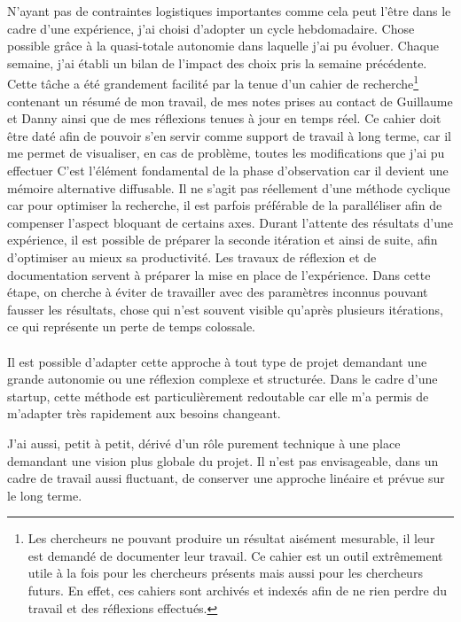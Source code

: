 \documentclass[11pt, a4paper ]{article}
\begin{document}
\begin{spacing}{1.5}
N'ayant pas de contraintes logistiques importantes comme cela peut l'être dans le cadre d'une expérience, j'ai choisi d'adopter un cycle hebdomadaire. Chose possible grâce à la quasi-totale autonomie dans laquelle j'ai pu évoluer. Chaque semaine, j'ai établi un bilan de l'impact des choix pris la semaine précédente. Cette tâche a été grandement facilité par la tenue d'un cahier de recherche\footnote{Les chercheurs ne pouvant produire un résultat aisément mesurable, il leur est demandé de documenter leur travail. Ce cahier est un outil extrêmement utile à la fois pour les chercheurs présents mais aussi pour les chercheurs futurs. En effet, ces cahiers sont archivés et indexés afin de ne rien perdre du travail et des réflexions effectués.} contenant un résumé de mon travail, de mes notes prises au contact de Guillaume et Danny ainsi que de mes réflexions tenues à jour en temps réel. Ce cahier doit être daté afin de pouvoir s'en servir comme support de travail à long terme, car il me permet de visualiser, en cas de problème, toutes les modifications que j'ai pu effectuer C'est l'élément fondamental de la phase d'observation car il devient une mémoire alternative diffusable.
Il ne s'agit pas réellement d'une méthode cyclique car pour optimiser la recherche, il est parfois préférable de la paralléliser afin de compenser l'aspect bloquant de certains axes. Durant l'attente des résultats d'une expérience, il est possible de préparer la seconde itération et ainsi de suite, afin d'optimiser au mieux sa productivité. Les travaux de réflexion et de documentation servent à préparer la mise en place de l’expérience. Dans cette étape, on cherche à éviter de travailler avec des paramètres inconnus pouvant fausser les résultats, chose qui n'est souvent visible qu'après plusieurs itérations, ce qui représente un perte de temps colossale.

\paragraph{}
Il est possible d'adapter cette approche à tout type de projet demandant une grande autonomie ou une réflexion complexe et structurée. Dans le cadre d'une startup, cette méthode est particulièrement redoutable car elle m'a permis de m'adapter très rapidement aux besoins changeant.

J'ai aussi, petit à petit, dérivé d'un rôle purement technique à une place demandant une vision plus globale du projet. Il n'est pas envisageable, dans un cadre de travail aussi fluctuant, de conserver une approche linéaire et prévue sur le long terme.


\end{spacing}
\end{document}

